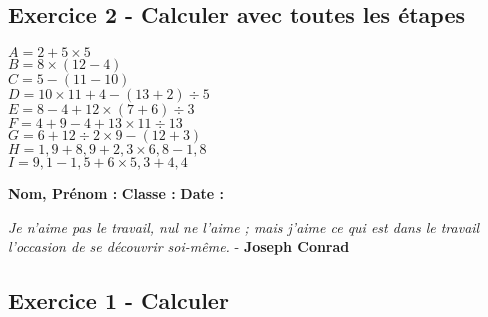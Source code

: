 \subsection*{Exercice 2 - Calculer avec toutes les étapes}

\begin{multicols}{3}
  \noindent
  $A = 2+5\times 5 $\\
  $B = 8 \times (12 - 4) $\\
  $C = 5-(11-10) $\\
  $D = 10\times 11+4-(13+2)\div 5 $\\
  $E = 8-4+12\times (7+6)\div 3 $\\
  $F = 4+9-4+13\times 11\div 13 $\\
  $G = 6+12\div 2\times 9-(12+3) $\\
  $H = 1{,}9+8{,}9+2{,}3\times 6{,}8-1{,}8 $\\
  $I = 9{,}1-1{,}5+6\times 5{,}3+4{,}4$
\end{multicols}

\vspace{4cm}

\textbf{Nom, Prénom :} \hspace{8cm} \textbf{Classe :} \hspace{3cm} \textbf{Date :}\\
\vspace{-0.8cm}
\begin{center}
  \textit{Je n'aime pas le travail, nul ne l'aime ; mais j'aime ce qui est dans le travail l'occasion de se découvrir soi-même.}  - \textbf{Joseph Conrad}
\end{center}
\vspace{-0.8cm}

\subsection*{Exercice 1 - Calculer}

